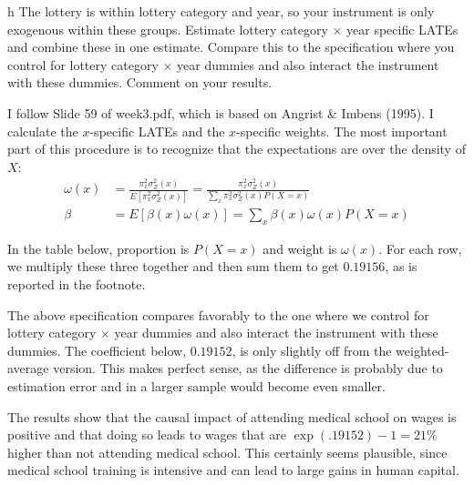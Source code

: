 \documentclass{article}
\begin{document}
\begin{problem}{h}
The lottery is within lottery category and year, so your instrument is only exogenous within these groups. Estimate lottery category $\times$ year specific LATEs and combine these in one estimate. Compare this to the specification where you control for lottery category $\times$ year dummies and also interact the instrument with these dummies. Comment on your results.
\end{problem}
\begin{solution}
I follow Slide 59 of week3.pdf, which is based on Angrist \& Imbens (1995). I calculate the $x$-specific LATEs and the $x$-specific weights. The most important part of this procedure is to recognize that the expectations are over the density of $X$:
\begin{align*}
    \omega(x) &= \frac{\pi_x^2 \sigma_Z^2(x)}{E[\pi_x^2 \sigma_Z^2(x)]} = \frac{\pi_x^2 \sigma_Z^2(x)}{\sum_x \pi_x^2 \sigma_Z^2(x) P(X=x)} \\
    \beta &= E[\beta(x)\omega(x)] = \sum_x \beta(x)\omega(x) P(X=x)
\end{align*}

In the table below, proportion is $P(X=x)$ and weight is $\omega(x)$. For each row, we multiply these three together and then sum them to get $0.19156$, as is reported in the footnote.
\begin{table}[H]
    \centering
    
\end{table}
The above specification compares favorably to the one where we control for lottery category $\times$ year dummies and also interact the instrument with these dummies. The coefficient below, $0.19152$, is only slightly off from the weighted-average version. This makes perfect sense, as the difference is probably due to estimation error and in a larger sample would become even smaller.
\begin{table}[H]
    \centering
    
\end{table}
The results show that the causal impact of attending medical school on wages is positive and that doing so leads to wages that are $\operatorname{exp}(.19152)-1=21\%$ higher than not attending medical school. This certainly seems plausible, since medical school training is intensive and can lead to large gains in human capital.
    




\end{solution}
\end{document}
